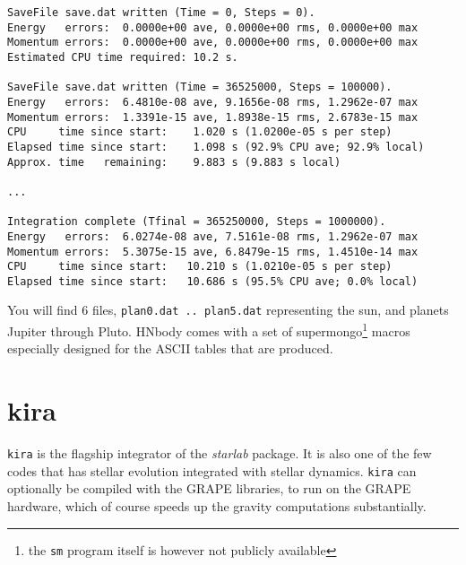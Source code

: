\begin{verbatim}
SaveFile save.dat written (Time = 0, Steps = 0).
Energy   errors:  0.0000e+00 ave, 0.0000e+00 rms, 0.0000e+00 max
Momentum errors:  0.0000e+00 ave, 0.0000e+00 rms, 0.0000e+00 max
Estimated CPU time required: 10.2 s.
 
SaveFile save.dat written (Time = 36525000, Steps = 100000).
Energy   errors:  6.4810e-08 ave, 9.1656e-08 rms, 1.2962e-07 max
Momentum errors:  1.3391e-15 ave, 1.8938e-15 rms, 2.6783e-15 max
CPU     time since start:    1.020 s (1.0200e-05 s per step)
Elapsed time since start:    1.098 s (92.9% CPU ave; 92.9% local)
Approx. time   remaining:    9.883 s (9.883 s local)
 
...
 
Integration complete (Tfinal = 365250000, Steps = 1000000).
Energy   errors:  6.0274e-08 ave, 7.5161e-08 rms, 1.2962e-07 max
Momentum errors:  5.3075e-15 ave, 6.8479e-15 rms, 1.4510e-14 max
CPU     time since start:   10.210 s (1.0210e-05 s per step)
Elapsed time since start:   10.686 s (95.5% CPU ave; 0.0% local)

\end{verbatim}\normalsize

You will find 6 files, {\tt plan0.dat .. plan5.dat} representing
the sun, and planets Jupiter through Pluto. HNbody comes with a
set of supermongo\footnote{the {\tt sm} program itself 
is however not publicly
available} macros especially  designed for the
ASCII tables that are produced.

\section{kira}

{\tt kira} is the flagship integrator of the {\it starlab} package. It is also
one of the few codes that has stellar evolution integrated with stellar
dynamics. {\tt kira} can optionally be compiled with the GRAPE libraries,
to run on the GRAPE hardware, which of course speeds up the gravity computations 
substantially.

